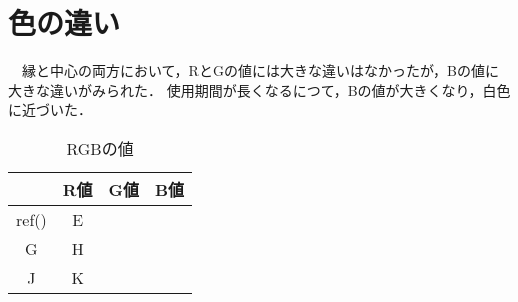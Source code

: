 \documentclass[main]{subfiles}
\begin{document}
\section{色の違い}

　縁と中心の両方において，RとGの値には大きな違いはなかったが，Bの値に大きな違いがみられた．
使用期間が長くなるにつて，Bの値が大きくなり，白色に近づいた．


\begin{table}[h]
    \caption{RGBの値}
    \label{table:SpeedOfLight}
    \centering
\begin{tabular}{|c|c|c|c|}
   \hline
    & R値 & G値 & B値 \\ \hline
   ref() & E & & \\ \hline
   G & H & & \\ \hline
   J & K & & \\ \hline
\end{tabular}    
\end{table}
\end{document}
